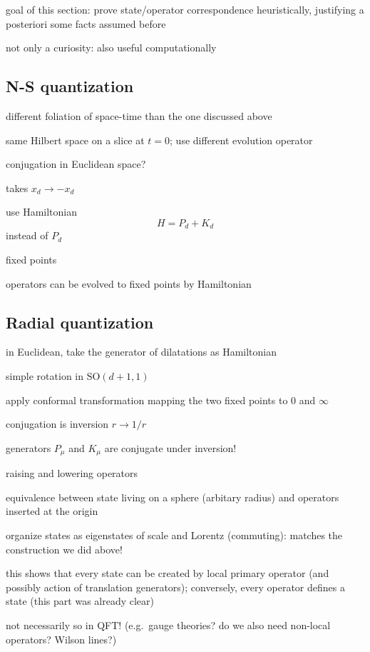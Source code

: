\documentclass[a4paper,12pt]{article}
\newcommand{\SO}{\text{SO}}
\numberwithin{equation}{section}
\begin{document}
goal of this section: prove state/operator correspondence heuristically, justifying a posteriori some facts assumed before

not only a curiosity: also useful computationally


\subsection{N-S quantization}

different foliation of space-time than the one discussed above



same Hilbert space on a slice at $t = 0$; use different evolution operator


conjugation in Euclidean space?

takes $x_d \to - x_d$

use Hamiltonian
\begin{equation}
	H = P_d + K_d
\end{equation}
instead of $P_d$

fixed points

operators can be evolved to fixed points by Hamiltonian


\subsection{Radial quantization}

in Euclidean, take the generator of dilatations as Hamiltonian

simple rotation in $\SO(d+1,1)$

apply conformal transformation mapping the two fixed points to 0 and $\infty$

conjugation is inversion $r \to 1/r$

generators $P_\mu$ and $K_\mu$ are conjugate under inversion!

raising and lowering operators


equivalence between state living on a sphere (arbitary radius) and operators inserted at the origin

organize states as eigenstates of scale and Lorentz (commuting): matches the construction we did above!

this shows that every state can be created by local primary operator (and possibly action of translation generators); conversely, every operator defines a state (this part was already clear)

not necessarily so in QFT! (e.g.~gauge theories? do we also need non-local operators? Wilson lines?)
\end{document}
